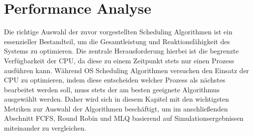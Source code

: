 \chapter{Performance Analyse}
Die richtige Auswahl der zuvor vorgestellten Scheduling Algorithmen ist ein essenzieller Bestandteil, um die Gesamtleistung und Reaktionsfähigkeit des Systems zu optimieren. Die zentrale Herausforderung hierbei ist die begrenzte Verfügbarkeit der \ac{CPU}, da diese zu einem Zeitpunkt stets nur einen Prozess ausführen kann. Während OS Scheduling Algorithmen versuchen den Einsatz der \ac{CPU} zu optimieren, indem diese entscheiden welcher Prozess als nächstes bearbeitet werden soll, muss stets der am besten geeignete Algorithmus ausgewählt werden. Daher wird sich in diesem Kapitel mit den wichtigsten Metriken zur Auswahl der Algorithmen beschäftigt, um im anschließenden Abschnitt \ac{FCFS}, Round Robin und \ac{MLQ} basierend auf Simulationsergebnissen miteinander zu vergleichen.